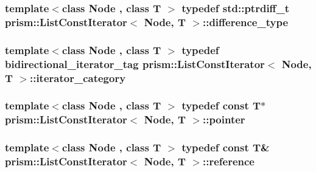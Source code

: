 \subsubsection[{\texorpdfstring{difference\+\_\+type}{difference_type}}]{\setlength{\rightskip}{0pt plus 5cm}template$<$class Node , class T $>$ typedef std\+::ptrdiff\+\_\+t {\bf prism\+::\+List\+Const\+Iterator}$<$ Node, T $>$\+::{\bf difference\+\_\+type}}\hypertarget{structprism_1_1_list_const_iterator_a16d9c896e7353dc34db8cd8e0edbf40d}{}\label{structprism_1_1_list_const_iterator_a16d9c896e7353dc34db8cd8e0edbf40d}
\subsubsection[{\texorpdfstring{iterator\+\_\+category}{iterator_category}}]{\setlength{\rightskip}{0pt plus 5cm}template$<$class Node , class T $>$ typedef {\bf bidirectional\+\_\+iterator\+\_\+tag} {\bf prism\+::\+List\+Const\+Iterator}$<$ Node, T $>$\+::{\bf iterator\+\_\+category}}\hypertarget{structprism_1_1_list_const_iterator_a6cf9898af1bc61457d9f8331a95bb1fa}{}\label{structprism_1_1_list_const_iterator_a6cf9898af1bc61457d9f8331a95bb1fa}
\subsubsection[{\texorpdfstring{pointer}{pointer}}]{\setlength{\rightskip}{0pt plus 5cm}template$<$class Node , class T $>$ typedef const T$\ast$ {\bf prism\+::\+List\+Const\+Iterator}$<$ Node, T $>$\+::{\bf pointer}}\hypertarget{structprism_1_1_list_const_iterator_a1c92e5a7b7d0a92c744027ca421cb651}{}\label{structprism_1_1_list_const_iterator_a1c92e5a7b7d0a92c744027ca421cb651}
\subsubsection[{\texorpdfstring{reference}{reference}}]{\setlength{\rightskip}{0pt plus 5cm}template$<$class Node , class T $>$ typedef const T\& {\bf prism\+::\+List\+Const\+Iterator}$<$ Node, T $>$\+::{\bf reference}}\hypertarget{structprism_1_1_list_const_iterator_ad35238dd195319f3f07c12769b52b472}{}\label{structprism_1_1_list_const_iterator_ad35238dd195319f3f07c12769b52b472}

